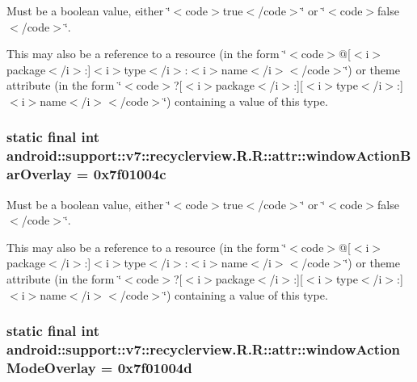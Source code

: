 Must be a boolean value, either \char`\"{}$<$code$>$true$<$/code$>$\char`\"{} or \char`\"{}$<$code$>$false$<$/code$>$\char`\"{}. 

This may also be a reference to a resource (in the form \char`\"{}$<$code$>$@\mbox{[}$<$i$>$package$<$/i$>$:\mbox{]}$<$i$>$type$<$/i$>$:$<$i$>$name$<$/i$>$$<$/code$>$\char`\"{}) or theme attribute (in the form \char`\"{}$<$code$>$?\mbox{[}$<$i$>$package$<$/i$>$:\mbox{]}\mbox{[}$<$i$>$type$<$/i$>$:\mbox{]}$<$i$>$name$<$/i$>$$<$/code$>$\char`\"{}) containing a value of this type. \hypertarget{classandroid_1_1support_1_1v7_1_1recyclerview_1_1_r_1_1attr_4e5e04df217d376d8a4c37444880dad7}{
\subsubsection[{windowActionBarOverlay}]{\setlength{\rightskip}{0pt plus 5cm}static final int android::support::v7::recyclerview.R.R::attr::windowActionBarOverlay = 0x7f01004c}}
\label{classandroid_1_1support_1_1v7_1_1recyclerview_1_1_r_1_1attr_4e5e04df217d376d8a4c37444880dad7}


Must be a boolean value, either \char`\"{}$<$code$>$true$<$/code$>$\char`\"{} or \char`\"{}$<$code$>$false$<$/code$>$\char`\"{}. 

This may also be a reference to a resource (in the form \char`\"{}$<$code$>$@\mbox{[}$<$i$>$package$<$/i$>$:\mbox{]}$<$i$>$type$<$/i$>$:$<$i$>$name$<$/i$>$$<$/code$>$\char`\"{}) or theme attribute (in the form \char`\"{}$<$code$>$?\mbox{[}$<$i$>$package$<$/i$>$:\mbox{]}\mbox{[}$<$i$>$type$<$/i$>$:\mbox{]}$<$i$>$name$<$/i$>$$<$/code$>$\char`\"{}) containing a value of this type. \hypertarget{classandroid_1_1support_1_1v7_1_1recyclerview_1_1_r_1_1attr_d26a3b0a625a8ba19ff21a835627a2a6}{
\subsubsection[{windowActionModeOverlay}]{\setlength{\rightskip}{0pt plus 5cm}static final int android::support::v7::recyclerview.R.R::attr::windowActionModeOverlay = 0x7f01004d}}
\label{classandroid_1_1support_1_1v7_1_1recyclerview_1_1_r_1_1attr_d26a3b0a625a8ba19ff21a835627a2a6}


